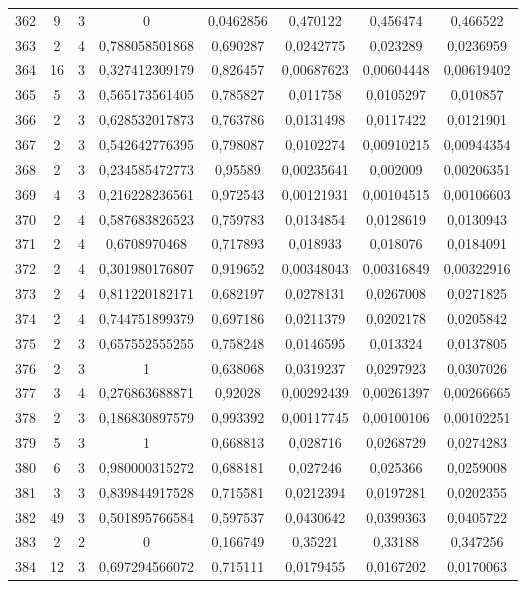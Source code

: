 \begin{longtable}{|c|c|c|c|c|c|c|c|}
362 & 9 & 3 & 0 & 0,0462856 & 0,470122 & 0,456474 & 0,466522  \\
363 & 2 & 4 & 0,788058501868 & 0,690287 & 0,0242775 & 0,023289 & 0,0236959  \\
364 & 16 & 3 & 0,327412309179 & 0,826457 & 0,00687623 & 0,00604448 & 0,00619402  \\
365 & 5 & 3 & 0,565173561405 & 0,785827 & 0,011758 & 0,0105297 & 0,010857  \\
366 & 2 & 3 & 0,628532017873 & 0,763786 & 0,0131498 & 0,0117422 & 0,0121901  \\
367 & 2 & 3 & 0,542642776395 & 0,798087 & 0,0102274 & 0,00910215 & 0,00944354  \\
368 & 2 & 3 & 0,234585472773 & 0,95589 & 0,00235641 & 0,002009 & 0,00206351  \\
369 & 4 & 3 & 0,216228236561 & 0,972543 & 0,00121931 & 0,00104515 & 0,00106603  \\
370 & 2 & 4 & 0,587683826523 & 0,759783 & 0,0134854 & 0,0128619 & 0,0130943  \\
371 & 2 & 4 & 0,6708970468 & 0,717893 & 0,018933 & 0,018076 & 0,0184091  \\
372 & 2 & 4 & 0,301980176807 & 0,919652 & 0,00348043 & 0,00316849 & 0,00322916  \\
373 & 2 & 4 & 0,811220182171 & 0,682197 & 0,0278131 & 0,0267008 & 0,0271825  \\
374 & 2 & 4 & 0,744751899379 & 0,697186 & 0,0211379 & 0,0202178 & 0,0205842  \\
375 & 2 & 3 & 0,657552555255 & 0,758248 & 0,0146595 & 0,013324 & 0,0137805  \\
376 & 2 & 3 & 1 & 0,638068 & 0,0319237 & 0,0297923 & 0,0307026  \\
377 & 3 & 4 & 0,276863688871 & 0,92028 & 0,00292439 & 0,00261397 & 0,00266665  \\
378 & 2 & 3 & 0,186830897579 & 0,993392 & 0,00117745 & 0,00100106 & 0,00102251  \\
379 & 5 & 3 & 1 & 0,668813 & 0,028716 & 0,0268729 & 0,0274283  \\
380 & 6 & 3 & 0,980000315272 & 0,688181 & 0,027246 & 0,025366 & 0,0259008  \\
381 & 3 & 3 & 0,839844917528 & 0,715581 & 0,0212394 & 0,0197281 & 0,0202355  \\
382 & 49 & 3 & 0,501895766584 & 0,597537 & 0,0430642 & 0,0399363 & 0,0405722  \\
383 & 2 & 2 & 0 & 0,166749 & 0,35221 & 0,33188 & 0,347256  \\
384 & 12 & 3 & 0,697294566072 & 0,715111 & 0,0179455 & 0,0167202 & 0,0170063  \\

\end{longtable}
